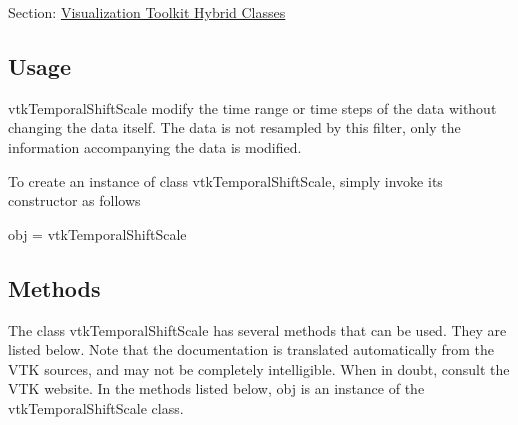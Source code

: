 Section\-: \hyperlink{sec_vtkhybrid}{Visualization Toolkit Hybrid Classes} \hypertarget{vtkwidgets_vtkxyplotwidget_Usage}{}\subsection{Usage}\label{vtkwidgets_vtkxyplotwidget_Usage}
vtk\-Temporal\-Shift\-Scale modify the time range or time steps of the data without changing the data itself. The data is not resampled by this filter, only the information accompanying the data is modified.

To create an instance of class vtk\-Temporal\-Shift\-Scale, simply invoke its constructor as follows \begin{DoxyVerb}  obj = vtkTemporalShiftScale
\end{DoxyVerb}
 \hypertarget{vtkwidgets_vtkxyplotwidget_Methods}{}\subsection{Methods}\label{vtkwidgets_vtkxyplotwidget_Methods}
The class vtk\-Temporal\-Shift\-Scale has several methods that can be used. They are listed below. Note that the documentation is translated automatically from the V\-T\-K sources, and may not be completely intelligible. When in doubt, consult the V\-T\-K website. In the methods listed below, {\ttfamily obj} is an instance of the vtk\-Temporal\-Shift\-Scale class. 
